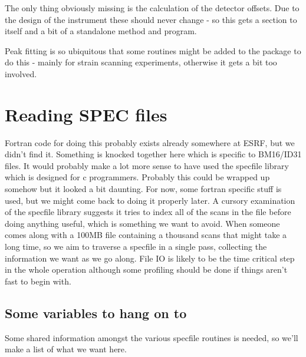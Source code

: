 \documentclass[10pt,a4paper,notitlepage]{article}
\begin{document}
The only thing obviously missing is the calculation of the detector offsets. 
Due to the design of the instrument these should never change - so this 
gets a section to itself and a bit of a standalone method and program.

Peak fitting is so ubiquitous that some routines might be added to the 
package to do this - mainly for strain scanning experiments, otherwise 
it gets a bit too involved.


\section{Reading SPEC files}

Fortran code for doing this probably exists already somewhere at ESRF, but we
didn't find it. 
Something is knocked together here which is specific to BM16/ID31 files.
It would probably make a lot more sense to have used the specfile 
library which is designed for c programmers. Probably this could be wrapped
up somehow but it looked a bit daunting. For now, some 
fortran specific stuff is used, but we might come back to doing it 
properly later.
A cursory examination of the specfile library suggests it tries to index
all of the scans in the file before doing anything useful, which is
something we want to avoid.
When someone comes along with a 100MB file containing a thousand scans that 
might take a long time, so we aim to traverse a specfile in a single pass,
collecting the information we want as we go along. 
File IO is likely to be the time critical step in the whole operation although
some profiling should be done if things aren't fast to begin with.

\subsection{Some variables to hang on to}

Some shared information amongst the various specfile 
routines is needed, so we'll make a list of what we want here.
\end{document}
